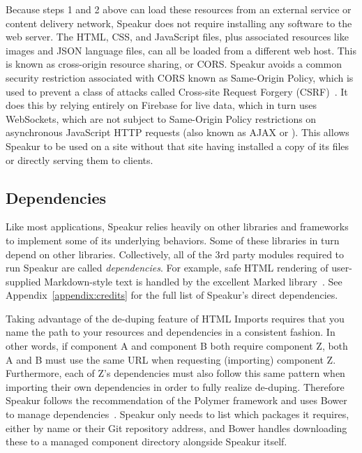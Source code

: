 Because steps 1 and 2 above can load these resources from an external service or content delivery network,
Speakur does not require installing any software to the web server.
The HTML, CSS, and JavaScript files, plus associated resources like images and JSON language files, 
can all be loaded from a different web host. 
This is known as cross-origin resource sharing, or CORS.
Speakur avoids a common security restriction associated with CORS known as Same-Origin Policy, which is used to prevent a class of attacks called Cross-site Request Forgery (CSRF)~\cite{mozillacontributors2015-b}.
It does this by relying entirely on Firebase for live data,
which in turn uses WebSockets,
which are not subject to Same-Origin Policy restrictions on asynchronous JavaScript HTTP requests (also known as AJAX or ).
This allows Speakur to be used on a site without that site having installed a copy of its files or directly serving them to clients.

\subsection{Dependencies}
\label{sec:dependencies}
Like most applications, Speakur relies heavily on other libraries and frameworks to implement some of its underlying behaviors. 
Some of these libraries in turn depend on other libraries.
Collectively, all of the 3rd party modules required to run Speakur are called \textit{dependencies}.
For example, safe HTML rendering of user-supplied Markdown-style text is handled by the excellent Marked library~\cite{christopherjeffrey2014}.
See Appendix~\ref{appendix:credits} for the full list of Speakur's direct dependencies.

Taking advantage of the de-duping feature of HTML Imports
requires that you name the path to your resources and dependencies in a consistent fashion.
In other words, if component A and component B both require component Z, both A and B must use the same URL when requesting (importing) component Z.
Furthermore, each of Z's dependencies must also follow this same pattern when importing their own dependencies in order to fully realize de-duping.
Therefore Speakur follows the recommendation of the Polymer framework and uses Bower to manage dependencies~\cite{bowercontributors2015}. 
Speakur only needs to list which packages it requires, either by name or their Git repository address, 
and Bower handles downloading these to a managed component directory alongside Speakur itself.

